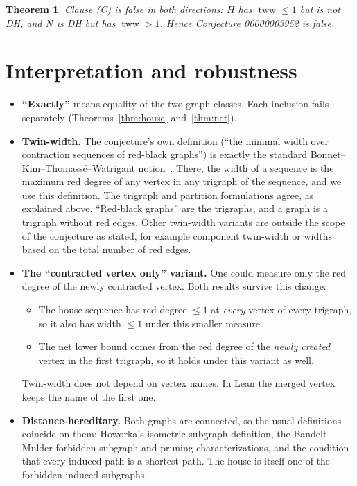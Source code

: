\documentclass[11pt]{article}
\newtheorem{theorem}{Theorem}
\theoremstyle{definition}
\theoremstyle{remark}
\begin{document}
\begin{theorem}\label{thm:main}
Clause (C) is false in both directions: $H$ has $\operatorname{tww}\le1$ but is not DH, and
$N$ is DH but has $\operatorname{tww}>1$. Hence Conjecture 00000003952 is false.
\end{theorem}

\section{Interpretation and robustness}
\begin{itemize}
\item \textbf{``Exactly''} means equality of the two graph classes. Each inclusion fails
separately (Theorems~\ref{thm:house} and~\ref{thm:net}).
\item \textbf{Twin-width.} The conjecture's own definition (``the minimal width over
contraction sequences of red-black graphs'') is exactly the standard
Bonnet--Kim--Thomass\'e--Watrigant notion~\cite{bktw}. There, the width of a sequence is the
maximum red degree of any vertex in any trigraph of the sequence, and we use this definition.
The trigraph and partition formulations agree, as explained above. ``Red-black graphs'' are
the trigraphs, and a graph is a trigraph without red edges. Other twin-width variants are
outside the scope of the conjecture as stated, for example component twin-width or widths
based on the total number of red edges.
\item \textbf{The ``contracted vertex only'' variant.} One could measure only the red degree
of the newly contracted vertex. Both results survive this change:
\begin{itemize}
\item The house sequence has red degree $\le1$ at \emph{every} vertex of every trigraph, so
it also has width $\le 1$ under this smaller measure.
\item The net lower bound comes from the red degree of the \emph{newly created} vertex in the
first trigraph, so it holds under this variant as well.
\end{itemize}
Twin-width does not depend on vertex names. In Lean the merged vertex keeps the name of the
first one.
\item \textbf{Distance-hereditary.} Both graphs are connected, so the usual definitions
coincide on them: Howorka's isometric-subgraph definition, the Bandelt--Mulder
forbidden-subgraph and pruning characterizations, and the condition that every induced
path is a shortest path. The house is itself one of the forbidden induced subgraphs.

\end{itemize}
\end{document}
